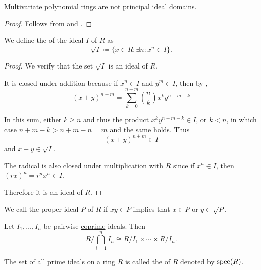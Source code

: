 \begin{corollary}\label{thm:multivariate_polynomial_rings_are_not_pid}
  Multivariate polynomial rings are not principal ideal domains.
\end{corollary}
\begin{proof}
  Follows from  and .
\end{proof}

\begin{definition}\label{def:radical_ideal}\cite[15]{Коцев2016}
  We define the  of the ideal \( I \) of \( R \) as
  \begin{equation*}
    \sqrt I \coloneqq \{ x \in R \colon \exists n: x^n \in I \}.
  \end{equation*}
\end{definition}
\begin{proof}
  We verify that the set \( \sqrt I \) is an ideal of \( R \).

  It is closed under addition because if \( x^n \in I \) and \( y^m \in I \), then by ,
  \begin{equation*}
    (x + y)^{n+m}
    =
    \sum_{k=0}^{n+m} \binom n k x^k y^{n+m-k}
  \end{equation*}

  In this sum, either \( k \geq n \) and thus the product \( x^k y^{n+m-k} \in I \), or \( k < n \), in which case \( n + m - k > n + m - n = m \) and the same holds. Thus
  \begin{equation*}
    (x + y)^{n+m} \in I
  \end{equation*}
  and \( x + y \in \sqrt I \).

  The radical is also closed under multiplication with \( R \) since if \( x^n \in I \), then \( (rx)^n = r^n x^n \in I \).

  Therefore it is an ideal of \( R \).
\end{proof}

\begin{definition}\label{def:primary_ring_ideal}\cite[74]{Коцев2016}
  We call the proper ideal \( P \) of \( R \)  if \( xy \in P \) implies that \( x \in P \) or \( y \in \sqrt P \).
\end{definition}

\begin{theorem}\label{thm:chinese_remained_theorem}\cite[theorem 8.27]{Knapp2016BAlg}
  Let \( I_1, \ldots, I_n \) be pairwise \hyperref[def:coprime_ring_ideals]{coprime} ideals. Then
  \begin{equation*}
    R / \bigcap_{i=1}^n I_n \cong R / I_1 \times \cdots \times R / I_n.
  \end{equation*}
\end{theorem}

\begin{definition}\label{def:spectrum_of_ring}
  The set of all prime ideals on a ring \( R \) is called the  of \( R \) denoted by \( \operatorname{spec}(R) \).
\end{definition}
